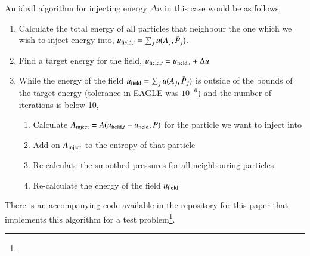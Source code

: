 An ideal algorithm for injecting energy $\Delta u$ in this case would be as
follows:
\begin{enumerate}
    \item Calculate the total energy of all particles that neighbour
          the one which we wish to inject energy into,
          $u_{{\rm field}, i} = \sum_j u(A_j, \bar{P}_j)$.
    \item Find a target energy for the field, $u_{{\rm field}, t} = 
          u_{{\rm field}, i} + \Delta u$
    \item While the energy of the field $u_{{\rm field}} = \sum_j u(A_j, \bar{P}_j)$
          is outside of the bounds of the target energy (tolerance in EAGLE
          was $10^{-6}$) and the number of iterations is below 10,
    \begin{enumerate}
        \item Calculate $A_{\rm inject} = A(u_{{\rm field}, t} - u_{{\rm field}},
              \bar{P})$ for the particle we want to inject into
        \item Add on $A_{\rm inject}$ to the entropy of that particle
        \item Re-calculate the smoothed pressures for all neighbouring particles
        \item Re-calculate the energy of the field $u_{{\rm field}}$
    \end{enumerate}
\end{enumerate}
There is an accompanying \python{} code available in the repository for
this paper that implements this algorithm for a test problem\footnote{}.

